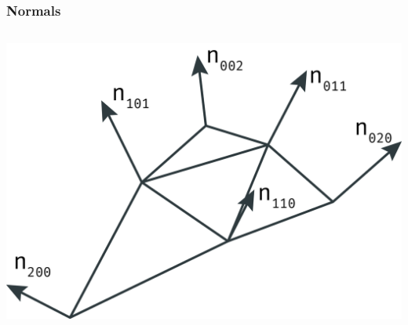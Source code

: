 	\begin{frame}
		\frametitle{Normals}
		\begin{columns}
			\begin{column}{0.6\textwidth}
				\begin{center}
					\includegraphics[width=\textwidth]{img/1_single/normals.png}
				\end{center}	
			\end{column}
		\end{columns}
	\end{frame}

